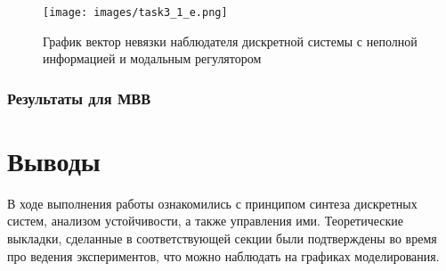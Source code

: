 \documentclass[a4paper, 14pt]{extarticle}
\theoremstyle{definition}
\theoremstyle{plain}
\theoremstyle{remark}
\begin{document}
\begin{figure}
	[H]
	\centering
	\texttt{[image: images/task3\_1\_e.png]}
	\caption{График вектор невязки наблюдателя дискретной системы с неполной информацией и модальным регулятором}
	\label{fig:task3_1_e}
\end{figure}

\subsubsection{Результаты для МВВ}




\newpage
\section{Выводы}
В ходе выполнения работы ознакомились с принципом синтеза дискретных систем, анализом устойчивости, а также управления ими. Теоретические выкладки, сделанные в соответствующей секции были подтверждены во время про ведения экспериментов, что можно наблюдать на графиках моделирования.
\end{document}
